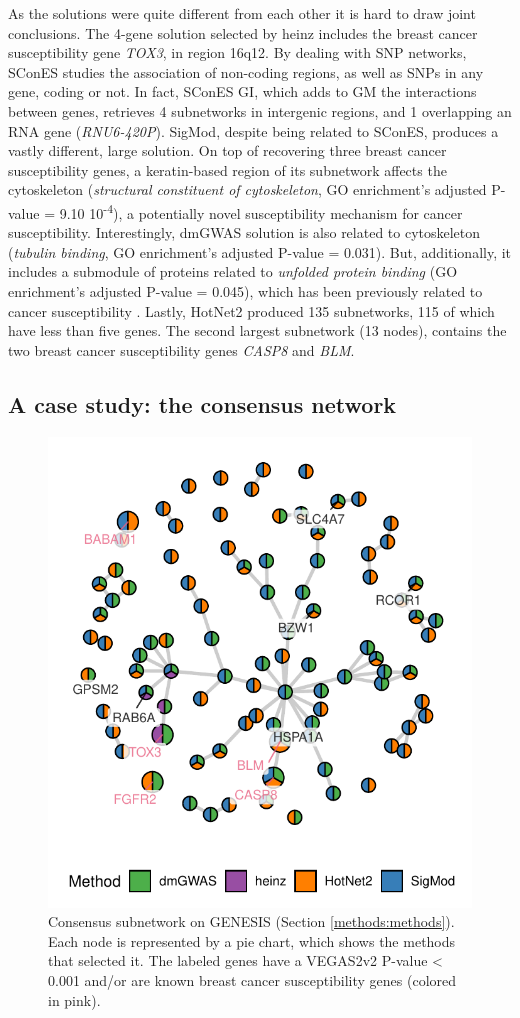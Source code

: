 \documentclass[twocolumn, 10pt]{article}
\begin{document}
As the solutions were quite different from each other it is hard to draw joint conclusions. The 4-gene solution selected by heinz includes the breast cancer susceptibility gene \emph{TOX3}, in region 16q12. By dealing with SNP networks, SConES studies the association of non-coding regions, as well as SNPs in any gene, coding or not. In fact, SConES GI, which adds to GM the interactions between genes, retrieves 4 subnetworks in intergenic regions, and 1 overlapping an RNA gene (\emph{RNU6-420P}). SigMod, despite being related to SConES, produces a vastly different, large solution. On top of recovering three breast cancer susceptibility genes, a keratin-based region of its subnetwork affects the cytoskeleton (\emph{structural constituent of cytoskeleton}, GO enrichment's adjusted P-value = 9.10 \texttimes{} 10\textsuperscript{-4}), a potentially novel susceptibility mechanism for cancer susceptibility. Interestingly, dmGWAS solution is also related to cytoskeleton (\emph{tubulin binding}, GO enrichment's adjusted P-value = 0.031). But, additionally, it includes a submodule of proteins related to \emph{unfolded protein binding} (GO enrichment's adjusted P-value = 0.045), which has been previously related to cancer susceptibility \cite{calderwood_heat_2016}. Lastly, HotNet2 produced 135 subnetworks, 115 of which have less than five genes. The second largest subnetwork (13 nodes), contains the two breast cancer susceptibility genes \emph{CASP8} and \emph{BLM}.

\subsection{A case study: the consensus network}
\label{results:consensus}
\begin{figure}[htbp]
  \centering
  \includegraphics[width=.5\linewidth]{./figures/figure_3.pdf}
  \caption{\label{fig:consensus}
    Consensus subnetwork on GENESIS (Section \ref{methods:methods}). Each node is represented by a pie chart, which shows the methods that selected it. The labeled genes have a VEGAS2v2 P-value < 0.001 and/or are known breast cancer susceptibility genes (colored in pink).}
\end{figure}
\end{document}
